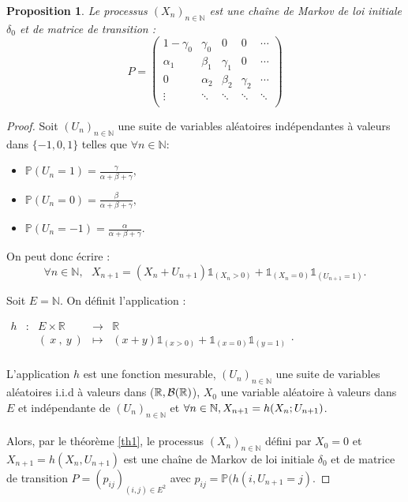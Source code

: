 \documentclass[12pt,a4paper]{report}
\newtheorem{prop}[thm]{Proposition}
\theoremstyle{remark}
\begin{document}
\begin{prop}\label{simple_markov}
Le processus $(X_n)_{n \in \mathbb{N}}$ est une chaîne de Markov de loi initiale $\delta_0$ et de matrice de transition :
$$P=
\begin{pmatrix}
        1-\gamma_0 & \gamma_0 & 0 & 0 & \cdots \\ 
         \alpha_1 & \beta_1 & \gamma_1 & 0 & \cdots\\
         0 & \alpha_2 & \beta_2 & \gamma_2 & \cdots\\
        \vdots &\ddots & \ddots & \ddots & \ddots \\ 
\end{pmatrix}$$
\end{prop}
\begin{proof}
Soit $(U_n)_{n\in \mathbb{N}}$ une suite de variables aléatoires indépendantes à valeurs dans $\{-1, 0, 1\}$ telles que $\forall n \in \mathbb{N}$: \\
\begin{itemize}
    \item $\mathbb{P}(U_n=1)= \frac{\gamma}{\alpha+\beta+\gamma},$
    \item $\mathbb{P}(U_n=0)= \frac{\beta}{\alpha+\beta+\gamma},$
    \item $\mathbb{P}(U_n=-1)= \frac{\alpha}{\alpha+\beta+\gamma}.$
\end{itemize}

\vspace{0.7cm}
On peut donc écrire : 
$$\forall n \in \mathbb{N}, \ \ \ X_{n+1} = (X_n + U_{n+1}) \mathds{1}_{(X_n >0)} + \mathds{1}_{(X_n=0)}\mathds{1}_{(U_{n+1}=1)}.$$

Soit $E=\mathbb{N}$. On définit l'application  : 
\begin{center}
$\begin{array}{ccccc}
h & : & E \times \mathbb{R} & \longrightarrow & \mathbb{R} \\
 & & (\ x \ ,\ y\ ) & \mapsto & (x + y) \mathds{1}_{(x >0)} + \mathds{1}_{(x=0)}\mathds{1}_{(y=1)}\\
\end{array}.$
\end{center}
 
\vspace{0.3cm}
L'application $h$ est une fonction mesurable, $(U_n)_{n\in\mathbb{N}}$ une suite de variables aléatoires i.i.d à valeurs dans ($\mathbb{R},\cal{B}(\mathbb{R})$), $X_0$ une variable aléatoire à valeurs dans $E$ et indépendante de $(U_n)_{n\in \mathbb{N}}$ et $\forall n \in \mathbb{N}, \ \\X_{n+1}=h(X_n;U_{n+1})$.
\\
\\
Alors, par le théorème \ref{th1}, le processus $(X_n)_{n\in\mathbb{N}}$ défini par $X_0 = 0$ et $X_{n+1}=h(X_n,U_{n+1})$ est une chaîne de Markov de loi initiale $\delta_0$ et de matrice de transition $P = (p_{ij})_{(i,j) \in E^2}$ avec $p_{ij} = \mathbb{P}(h(i, U_{n+1} = j)$. 
\end{proof}
\vspace{0.5cm}
\end{document}
